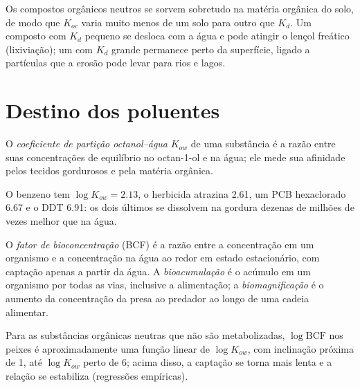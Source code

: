 Os compostos orgânicos neutros se sorvem sobretudo na matéria orgânica do solo, de modo que $K_{oc}$ varia
muito menos de um solo para outro que $K_d$. Um composto com $K_d$ pequeno se desloca com a água
e pode atingir o lençol freático (lixiviação); um com $K_d$ grande permanece perto da superfície,
ligado a partículas que a erosão pode levar para rios e lagos.

\section{Destino dos poluentes}

\begin{definition}\label{def:b3:environmental-toxicology:kow}
O \emph{coeficiente de partição octanol--água}
$K_{ow}$ de uma substância é a razão entre suas concentrações de equilíbrio no
octan-1-ol e na água; ele mede sua afinidade pelos tecidos gordurosos e pela matéria
orgânica.
\end{definition}

O benzeno tem $\log K_{ow} = 2.13$, o herbicida atrazina 2.61, um PCB hexaclorado 6.67 e o
DDT 6.91: os dois últimos se dissolvem na gordura dezenas de milhões de vezes melhor que na
água.

\begin{definition}[Bioacumulação]\label{def:b3:environmental-toxicology:bio}
O \emph{fator de bioconcentração} (BCF) é a
razão entre a concentração em um organismo e a concentração na água ao redor em
estado estacionário, com captação apenas a partir da água. A \emph{bioacumulação}
é o acúmulo em um organismo por todas as vias, inclusive a alimentação;
a \emph{biomagnificação} é o aumento da
concentração da presa ao predador ao longo de uma cadeia alimentar.
\end{definition}

\begin{proposition}[BCF e $K_{ow}$]\label{prop:b3:environmental-toxicology:bcf-kow}
Para as substâncias orgânicas neutras que não são metabolizadas, $\log\mathrm{BCF}$ nos peixes é
aproximadamente uma função linear de $\log K_{ow}$, com inclinação próxima de 1, até $\log K_{ow}$ perto de 6;
acima disso, a captação se torna mais lenta e a relação se estabiliza (regressões empíricas).
\admitted
\end{proposition}

